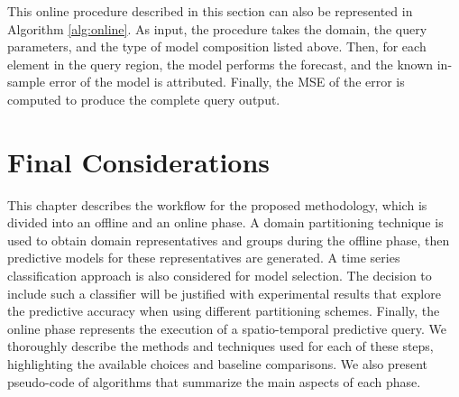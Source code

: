 This online procedure described in this section can also be represented in Algorithm \ref{alg:online}. As input, the procedure takes the domain, the query parameters, and the type of model composition listed above. Then, for each element in the query region, the model performs the forecast, and the known in-sample error of the model is attributed. Finally, the MSE of the error is computed to produce the complete query output.

\section{Final Considerations}
\label{Sec:MethodologySummary}

This chapter describes the workflow for the proposed methodology, which is divided into an offline and an online phase. A domain partitioning technique is used to obtain domain representatives and groups during the offline phase, then predictive models for these representatives are generated. A time series classification approach is also considered for model selection. The decision to include such a classifier will be justified with experimental results that explore the predictive accuracy when using different partitioning schemes. Finally, the online phase represents the execution of a spatio-temporal predictive query. We thoroughly describe the methods and techniques used for each of these steps, highlighting the available choices and baseline comparisons. We also present pseudo-code of algorithms that summarize the main aspects of each phase.